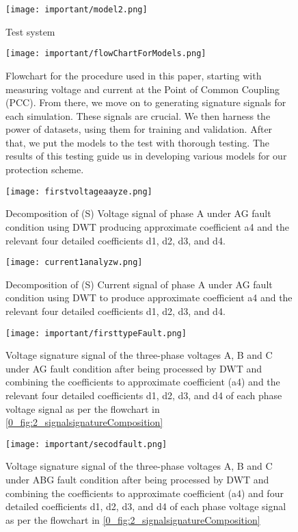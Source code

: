 \documentclass[8pt,a4paper,oneside]{elsarticle}
\begin{document}
\begin{figure}[H]
    \centering
    \texttt{[image: important/model2.png]}
    \caption{Test system}
    \label{0_fig:3_system}
\end{figure}
\begin{figure}[H]
    \centering
    \texttt{[image: important/flowChartForModels.png]}
    \caption{Flowchart for the procedure used in this paper, starting with measuring voltage and current at the Point of Common Coupling (PCC). From there, we move on to generating signature signals for each simulation. These signals are crucial. We then harness the power of datasets, using them for training and validation. After that, we put the models to the test with thorough testing. The results of this testing guide us in developing various models for our protection scheme.}
    \label{0_fig:4_procedureOfModels}
\end{figure}
\begin{figure}[H]
    \centering
    \texttt{[image: firstvoltageaayze.png]}
    \caption{Decomposition of (S) Voltage signal of phase A under AG fault condition
using DWT producing approximate coefficient a4 and the relevant four detailed coefficients d1, d2, d3, and d4.}
    \label{0_fig:5_firstVoltageFaultAnalysis}
\end{figure}
\begin{figure}[H]
    \centering
    \texttt{[image: current1analyzw.png]}
    \caption{Decomposition of (S) Current signal of phase A under AG fault condition
using DWT to produce approximate coefficient a4 and the relevant four detailed coefficients d1, d2, d3, and d4.}
    \label{0_fig:6_firstCurrentFaultAnalysis}
\end{figure}
\begin{figure}[H]
    \centering
    \texttt{[image: important/firsttypeFault.png]}
    \caption{Voltage signature signal of the three-phase voltages A, B and C under
AG fault condition after being processed by DWT and combining the coefficients to approximate coefficient (a4) and the relevant four detailed coefficients d1, d2, d3, and d4 of each phase voltage signal as per the flowchart in \ref{0_fig:2_signalsignatureComposition} }
    \label{0_fig:7_AG_voltage_signatureSignal}
\end{figure}
\begin{figure}[H]
    \centering
    \texttt{[image: important/secodfault.png]}
    \caption{Voltage signature signal of the three-phase voltages A, B and C under
ABG fault condition after being processed by DWT and combining the coefficients to approximate coefficient (a4) and four detailed coefficients d1, d2, d3, and d4 of each phase voltage signal as per the flowchart in \ref{0_fig:2_signalsignatureComposition}}
    \label{0_fig:8_ABG_voltage_signatureSignal}
\end{figure}
\end{document}
